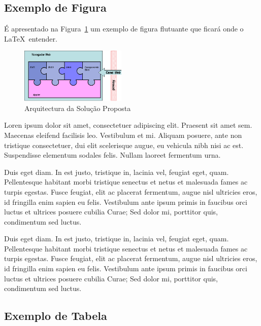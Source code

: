 \documentclass[twocolumn,twoside,10pt,a4paper]{article}
\begin{document}
\subsection{Exemplo de Figura}

É apresentado na Figura~\ref{fig:arch} %
um exemplo de figura flutuante que ficará onde o \LaTeX\ entender.

\begin{figure}
  \begin{center}
    \leavevmode
    \includegraphics[width=0.45\textwidth]{puzzle}
    \caption{Arquitectura da Solução Proposta}
    \label{fig:arch}
  \end{center}
\end{figure}

Loren ipsum dolor sit amet, consectetuer adipiscing elit. 
Praesent sit amet sem. Maecenas eleifend facilisis leo. Vestibulum et
mi. Aliquam posuere, ante non tristique consectetuer, dui elit
scelerisque augue, eu vehicula nibh nisi ac est. Suspendisse elementum
sodales felis. Nullam laoreet fermentum urna. 

Duis eget diam. In est justo, tristique in, lacinia vel, feugiat eget,
quam. Pellentesque habitant morbi tristique senectus et netus et
malesuada fames ac turpis egestas. Fusce feugiat, elit ac placerat
fermentum, augue nisl ultricies eros, id fringilla enim sapien eu
felis. Vestibulum ante ipsum primis in faucibus orci luctus et
ultrices posuere cubilia Curae; Sed dolor mi, porttitor quis,
condimentum sed luctus. 

Duis eget diam. In est justo, tristique in, lacinia vel, feugiat eget,
quam. Pellentesque habitant morbi tristique senectus et netus et
malesuada fames ac turpis egestas. Fusce feugiat, elit ac placerat
fermentum, augue nisl ultricies eros, id fringilla enim sapien eu
felis. Vestibulum ante ipsum primis in faucibus orci luctus et
ultrices posuere cubilia Curae; Sed dolor mi, porttitor quis,
condimentum sed luctus. 

\subsection{Exemplo de Tabela}
\end{document}
